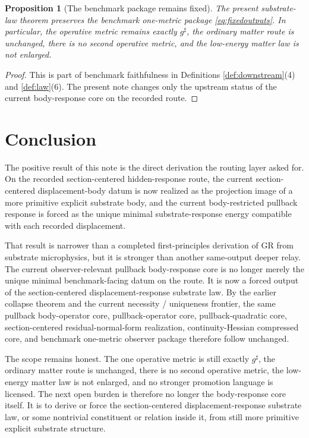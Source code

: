 \documentclass[11pt]{article}
\newcommand{\CompletedMetric}{g^{\sharp}}
\newtheorem{proposition}{Proposition}
\begin{document}
\begin{proposition}[The benchmark package remains fixed]
\label{prop:benchmark}
The present substrate-law theorem preserves the benchmark one-metric package \eqref{eq:fixedoutputs}. In particular, the operative metric remains exactly \(\CompletedMetric\), the ordinary matter route is unchanged, there is no second operative metric, and the low-energy matter law is not enlarged.
\end{proposition}

\begin{proof}
This is part of benchmark faithfulness in Definitions \ref{def:downstream}(4) and \ref{def:law}(6). The present note changes only the upstream status of the current body-response core on the recorded route.
\end{proof}

\section{Conclusion}

The positive result of this note is the direct derivation the routing layer asked for. On the recorded section-centered hidden-response route, the current section-centered displacement-body datum is now realized as the projection image of a more primitive explicit substrate body, and the current body-restricted pullback response is forced as the unique minimal substrate-response energy compatible with each recorded displacement.

That result is narrower than a completed first-principles derivation of GR from substrate microphysics, but it is stronger than another same-output deeper relay. The current observer-relevant pullback body-response core is no longer merely the unique minimal benchmark-facing datum on the route. It is now a forced output of the section-centered displacement-response substrate law. By the earlier collapse theorem and the current necessity / uniqueness frontier, the same pullback body-operator core, pullback-operator core, pullback-quadratic core, section-centered residual-normal-form realization, continuity-Hessian compressed core, and benchmark one-metric observer package therefore follow unchanged.

The scope remains honest. The one operative metric is still exactly \(\CompletedMetric\), the ordinary matter route is unchanged, there is no second operative metric, the low-energy matter law is not enlarged, and no stronger promotion language is licensed. The next open burden is therefore no longer the body-response core itself. It is to derive or force the section-centered displacement-response substrate law, or some nontrivial constituent or relation inside it, from still more primitive explicit substrate structure.
\end{document}

